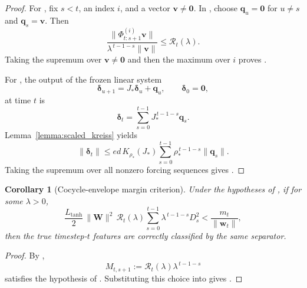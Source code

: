 \documentclass{article}
\newtheorem{corollary}[theorem]{Corollary}
\theoremstyle{remark}
\newcommand{\bW}{\mathbf{W}}
\begin{document}
\begin{proof}
For , fix $s<t$, an index $i$, and a vector
$\mathbf{v}\neq \mathbf{0}$. In , choose
$\mathbf{q}_u=\mathbf{0}$ for $u\neq s$ and $\mathbf{q}_s=\mathbf{v}$. Then
\[
  \frac{\|\Phi_{t:s+1}^{(i)}\mathbf{v}\|}
       {\lambda^{\,t-1-s}\|\mathbf{v}\|}
  \leq \mathcal{R}_t(\lambda).
\]
Taking the supremum over $\mathbf{v}\neq \mathbf{0}$ and then the maximum over
$i$ proves .

For , the output of the frozen linear system
\[
  \boldsymbol{\delta}_{u+1} = J_\ast \boldsymbol{\delta}_u + \mathbf{q}_u,
  \qquad \boldsymbol{\delta}_0 = \mathbf{0},
\]
at time $t$ is
\[
  \boldsymbol{\delta}_t = \sum_{s=0}^{t-1} J_\ast^{\,t-1-s}\mathbf{q}_s.
\]
Lemma~\ref{lemma:scaled_kreiss} yields
\[
  \|\boldsymbol{\delta}_t\|
  \leq e d\,K_{\rho_\ast}(J_\ast)
  \sum_{s=0}^{t-1}\rho_\ast^{\,t-1-s}\|\mathbf{q}_s\|.
\]
Taking the supremum over all nonzero forcing sequences gives
.
\end{proof}

\begin{corollary}[Cocycle-envelope margin criterion]
\label{cor:cocycle_margin}
Under the hypotheses of , if for some $\lambda>0$,
\begin{equation}
  \frac{L_{\tanh}}{2}\,\|\bW\|^2\,\mathcal{R}_t(\lambda)
  \sum_{s=0}^{t-1}\lambda^{\,t-1-s} D_s^2
  < \frac{m_t}{\|\mathbf{w}_t\|},
  \label{eq:cocycle_margin_condition}
\end{equation}
then the true timestep-$t$ features are correctly classified by the same
separator.
\end{corollary}

\begin{proof}
By ,
\[
  M_{t,s+1} := \mathcal{R}_t(\lambda)\lambda^{\,t-1-s}
\]
satisfies the hypothesis of . Substituting this
choice into  gives
.
\end{proof}
\end{document}
